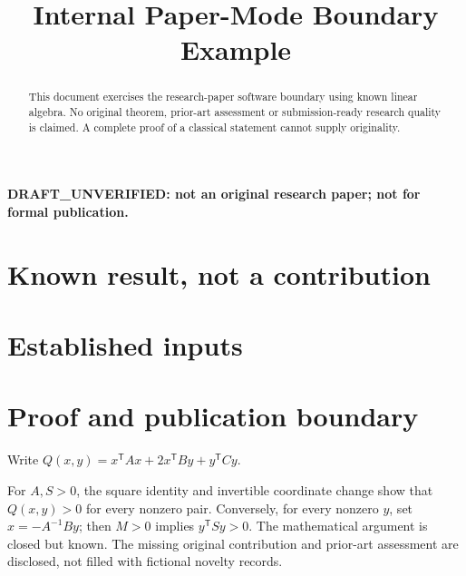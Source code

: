 \documentclass[12pt,reqno]{amsart}
\title{Internal Paper-Mode Boundary Example}
\date{}
\begin{document}
\maketitle
\noindent\textbf{DRAFT\_UNVERIFIED: not an original research paper; not for formal publication.}
\begin{abstract}This document exercises the research-paper software boundary using known
linear algebra. No original theorem, prior-art assessment or submission-ready research
quality is claimed. A complete proof of a classical statement cannot supply originality.\end{abstract}
\section{Known result, not a contribution}
\begin{theorem}

\end{theorem}
\section{Established inputs}
\begin{lemma}\end{lemma}
\begin{lemma}\end{lemma}
\begin{proposition}\end{proposition}
\section{Proof and publication boundary}
Write $Q(x,y)=x^{\mathsf T}Ax+2x^{\mathsf T}By+y^{\mathsf T}Cy$.

For $A,S>0$, the square identity and invertible coordinate change show that
$Q(x,y)>0$ for every nonzero pair. Conversely, for every nonzero $y$, set
$x=-A^{-1}By$; then $M>0$ implies $y^{\mathsf T}Sy>0$.
The mathematical argument is closed but known. The missing original contribution
and prior-art assessment are disclosed, not filled with fictional novelty records.
\nocite{S-guide}
\end{document}
